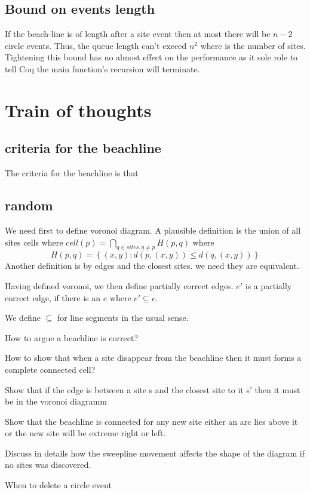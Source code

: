 \documentclass{article}
\begin{document}
\subsection{Bound on events length} If the beach-line is of length after a site event then at most there will be $n-2$ circle events. Thus, the queue length can't exceed $n^2$ where is the number of sites. Tightening this bound has no almost effect on the performance as it sole role to tell Coq the main function's recursion will terminate.

\section{Train of thoughts}
\subsection{criteria for the beachline}
The criteria for the beachline is that 

\subsection{random}
We need first to define voronoi diagram. A plausible definition is the union of all sites cells where $cell(p)= \bigcap_{q \in sites, q\not = p} H(p, q) $ where 
$$H(p, q) = \left\{(x,y) : d\left(p,(x, y) \right) \leq  d\left(q,(x, y) \right) \right\}$$ 
Another definition is by edges and the closest sites. we need they are equivalent.

Having defined voronoi, we then define partially correct edges. $e'$ is a partially correct edge, if there is an $e$ where $e' \subseteq e$.

We define $\subseteq$ for line segments in the usual sense. 

How to argue a beachline is correct?

How to show that when a site disappear from the beachline then it must forms a complete connected cell?

Show that if the edge is between a site s and the closest site to it s' then it must be in the voronoi diagramm

Show that the beachline is connected for any new site either an arc lies above it or the new site will be extreme right or left.

Discuss in details how the sweepline movement affects the shape of the diagram if no sites was discovered.

When to delete a circle event
\end{document}

